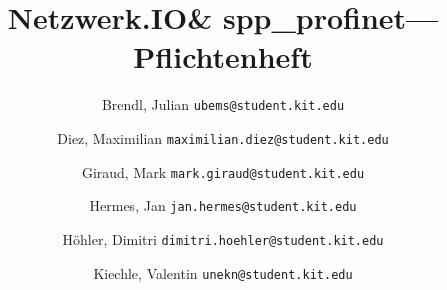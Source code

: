 \documentclass[a4paper]{scrreprt}
\newcommand{\sppname}{spp\_profinet}
\newcommand{\programname}{Netzwerk.IO}
\begin{document}
\title{\programname \& \sppname --- Pflichtenheft}
\author{
    Brendl, Julian
    \texttt{ubems@student.kit.edu}
    \and
    Diez, Maximilian
    \texttt{maximilian.diez@student.kit.edu}
    \and
    Giraud, Mark
    \texttt{mark.giraud@student.kit.edu}
    \and
    Hermes, Jan
    \texttt{jan.hermes@student.kit.edu}
    \and
    Höhler, Dimitri
    \texttt{dimitri.hoehler@student.kit.edu}
    \and
    Kiechle, Valentin
    \texttt{unekn@student.kit.edu}
}
\maketitle



\newpage
\tableofcontents
\newpage
\listoffigures



















\appendix

\end{document}
